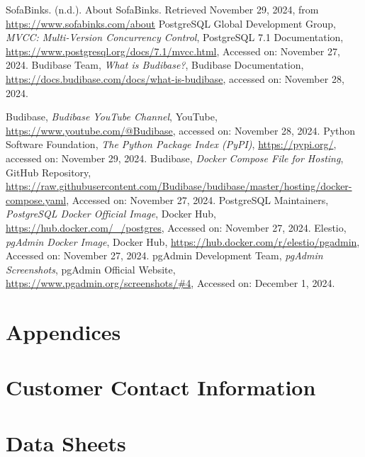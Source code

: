 \documentclass{article}
\begin{document}
\begin{thebibliography}{99}
 SofaBinks. (n.d.). 
    About SofaBinks. Retrieved November 29, 2024, from \url{https://www.sofabinks.com/about}
 PostgreSQL Global Development Group, \textit{MVCC: Multi-Version Concurrency Control}, 
    PostgreSQL 7.1 Documentation, \url{https://www.postgresql.org/docs/7.1/mvcc.html}, Accessed on: November 27, 2024.
Budibase Team, 
\textit{What is Budibase?}, Budibase Documentation, 
\url{https://docs.budibase.com/docs/what-is-budibase}, 
accessed on: November 28, 2024.

Budibase, 
\textit{Budibase YouTube Channel}, YouTube, 
\url{https://www.youtube.com/@Budibase}, 
accessed on: November 28, 2024.
Python Software Foundation, 
\textit{The Python Package Index (PyPI)}, 
\url{https://pypi.org/}, 
accessed on: November 29, 2024.
 Budibase, \textit{Docker Compose File for Hosting}, 
GitHub Repository, \url{https://raw.githubusercontent.com/Budibase/budibase/master/hosting/docker-compose.yaml}, 
Accessed on: November 27, 2024.
 PostgreSQL Maintainers, 
\textit{PostgreSQL Docker Official Image}, Docker Hub, 
\url{https://hub.docker.com/_/postgres}, 
Accessed on: November 27, 2024.
 Elestio, 
\textit{pgAdmin Docker Image}, Docker Hub, 
\url{https://hub.docker.com/r/elestio/pgadmin}, 
Accessed on: November 27, 2024.
 pgAdmin Development Team, 
\textit{pgAdmin Screenshots}, pgAdmin Official Website, 
\url{https://www.pgadmin.org/screenshots/#4}, 
Accessed on: December 1, 2024.
\end{thebibliography}



\newpage
\section*{Appendices} %
\appendix
\section{Customer Contact Information}
\section{Data Sheets}
\end{document}
